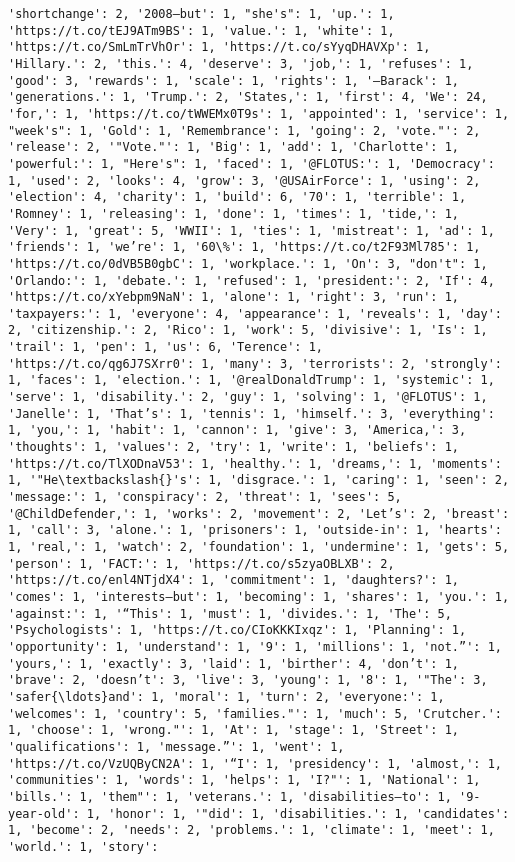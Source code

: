 \documentclass[11pt]{article}
\begin{document}
\begin{Verbatim}[commandchars=\\\{\}]
'shortchange': 2, '2008—but': 1, "she's": 1, 'up.': 1, 'https://t.co/tEJ9ATm9BS': 1, 'value.': 1, 'white': 1, 'https://t.co/SmLmTrVhOr': 1, 'https://t.co/sYyqDHAVXp': 1, 'Hillary.': 2, 'this.': 4, 'deserve': 3, 'job,': 1, 'refuses': 1, 'good': 3, 'rewards': 1, 'scale': 1, 'rights': 1, '—Barack': 1, 'generations.': 1, 'Trump.': 2, 'States,': 1, 'first': 4, 'We': 24, 'for,': 1, 'https://t.co/tWWEMx0T9s': 1, 'appointed': 1, 'service': 1, "week's": 1, 'Gold': 1, 'Remembrance': 1, 'going': 2, 'vote."': 2, 'release': 2, '"Vote."': 1, 'Big': 1, 'add': 1, 'Charlotte': 1, 'powerful:': 1, "Here's": 1, 'faced': 1, '@FLOTUS:': 1, 'Democracy': 1, 'used': 2, 'looks': 4, 'grow': 3, '@USAirForce': 1, 'using': 2, 'election': 4, 'charity': 1, 'build': 6, '70': 1, 'terrible': 1, 'Romney': 1, 'releasing': 1, 'done': 1, 'times': 1, 'tide,': 1, 'Very': 1, 'great': 5, 'WWII': 1, 'ties': 1, 'mistreat': 1, 'ad': 1, 'friends': 1, 'we’re': 1, '60\%': 1, 'https://t.co/t2F93Ml785': 1, 'https://t.co/0dVB5B0gbC': 1, 'workplace.': 1, 'On': 3, "don't": 1, 'Orlando:': 1, 'debate.': 1, 'refused': 1, 'president:': 2, 'If': 4, 'https://t.co/xYebpm9NaN': 1, 'alone': 1, 'right': 3, 'run': 1, 'taxpayers:': 1, 'everyone': 4, 'appearance': 1, 'reveals': 1, 'day': 2, 'citizenship.': 2, 'Rico': 1, 'work': 5, 'divisive': 1, 'Is': 1, 'trail': 1, 'pen': 1, 'us': 6, 'Terence': 1, 'https://t.co/qg6J7SXrr0': 1, 'many': 3, 'terrorists': 2, 'strongly': 1, 'faces': 1, 'election.': 1, '@realDonaldTrump': 1, 'systemic': 1, 'serve': 1, 'disability.': 2, 'guy': 1, 'solving': 1, '@FLOTUS': 1, 'Janelle': 1, 'That’s': 1, 'tennis': 1, 'himself.': 3, 'everything': 1, 'you,': 1, 'habit': 1, 'cannon': 1, 'give': 3, 'America,': 3, 'thoughts': 1, 'values': 2, 'try': 1, 'write': 1, 'beliefs': 1, 'https://t.co/TlXODnaV53': 1, 'healthy.': 1, 'dreams,': 1, 'moments': 1, '"He\textbackslash{}'s': 1, 'disgrace.': 1, 'caring': 1, 'seen': 2, 'message:': 1, 'conspiracy': 2, 'threat': 1, 'sees': 5, '@ChildDefender,': 1, 'works': 2, 'movement': 2, 'Let’s': 2, 'breast': 1, 'call': 3, 'alone.': 1, 'prisoners': 1, 'outside-in': 1, 'hearts': 1, 'real,': 1, 'watch': 2, 'foundation': 1, 'undermine': 1, 'gets': 5, 'person': 1, 'FACT:': 1, 'https://t.co/s5zyaOBLXB': 2, 'https://t.co/enl4NTjdX4': 1, 'commitment': 1, 'daughters?': 1, 'comes': 1, 'interests—but': 1, 'becoming': 1, 'shares': 1, 'you.': 1, 'against:': 1, '“This': 1, 'must': 1, 'divides.': 1, 'The': 5, 'Psychologists': 1, 'https://t.co/CIoKKKIxqz': 1, 'Planning': 1, 'opportunity': 1, 'understand': 1, '9': 1, 'millions': 1, 'not.”': 1, 'yours,': 1, 'exactly': 3, 'laid': 1, 'birther': 4, 'don’t': 1, 'brave': 2, 'doesn’t': 3, 'live': 3, 'young': 1, '8': 1, '"The': 3, 'safer{\ldots}and': 1, 'moral': 1, 'turn': 2, 'everyone:': 1, 'welcomes': 1, 'country': 5, 'families."': 1, 'much': 5, 'Crutcher.': 1, 'choose': 1, 'wrong."': 1, 'At': 1, 'stage': 1, 'Street': 1, 'qualifications': 1, 'message.”': 1, 'went': 1, 'https://t.co/VzUQByCN2A': 1, '“I': 1, 'presidency': 1, 'almost,': 1, 'communities': 1, 'words': 1, 'helps': 1, 'I?"': 1, 'National': 1, 'bills.': 1, 'them"': 1, 'veterans.': 1, 'disabilities—to': 1, '9-year-old': 1, 'honor': 1, '"did': 1, 'disabilities.': 1, 'candidates': 1, 'become': 2, 'needs': 2, 'problems.': 1, 'climate': 1, 'meet': 1, 'world.': 1, 'story': 
\end{Verbatim}
\end{document}
